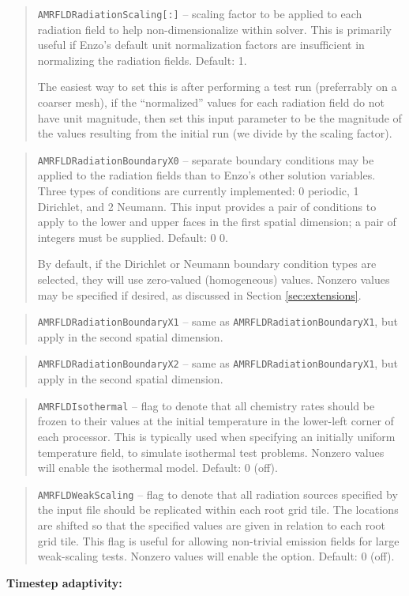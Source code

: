 \documentclass[10pt]{article}
\renewcommand{\(}{\left(}
\renewcommand{\)}{\right)}
\begin{document}
\blockquote{{\tt AMRFLDRadiationScaling[:]} -- scaling factor to be
  applied to each radiation field to help non-dimensionalize within
  solver.  This is primarily useful if Enzo's default unit
  normalization factors are insufficient in normalizing the radiation
  fields.  Default: 1.

  The easiest way to set this is after performing a test run
  (preferrably on a coarser mesh), if the ``normalized'' values for
  each radiation field do not have unit magnitude, then set this input
  parameter to be the magnitude of the values resulting from the
  initial run (we divide by the scaling factor).}
%
\blockquote{{\tt AMRFLDRadiationBoundaryX0} -- separate boundary
  conditions may be applied to the radiation fields than to Enzo's
  other solution variables.  Three types of conditions are currently
  implemented: 0 periodic, 1 Dirichlet, and 2 Neumann.  This input
  provides a pair of conditions to apply to the lower and upper faces
  in the first spatial dimension; a pair of integers must be supplied.
  Default: 0 0.

  By default, if the Dirichlet or Neumann boundary condition types are
  selected, they will use zero-valued (homogeneous) values.  Nonzero
  values may be specified if desired, as discussed in Section
  \ref{sec:extensions}.
}
%
\blockquote{{\tt AMRFLDRadiationBoundaryX1} -- same as 
  {\tt AMRFLDRadiationBoundaryX1}, but apply in the second spatial
  dimension.} 
%
\blockquote{{\tt AMRFLDRadiationBoundaryX2} -- same as 
  {\tt AMRFLDRadiationBoundaryX1}, but apply in the second spatial
  dimension.}
%
\blockquote{{\tt AMRFLDIsothermal} -- flag to denote that all
  chemistry rates should be frozen to their values at the initial
  temperature in the lower-left corner of each processor.  This is
  typically used when specifying an initially uniform temperature
  field, to simulate isothermal test problems.  Nonzero values will
  enable the isothermal model.  Default: 0 (off).}
%
\blockquote{{\tt AMRFLDWeakScaling} -- flag to denote that all
  radiation sources specified by the input file should be replicated
  within each root grid tile.  The locations are shifted so that the
  specified values are given in relation to each root grid tile.  This
  flag is useful for allowing non-trivial emission fields for
  large weak-scaling tests.  Nonzero values will enable the option.
  Default: 0 (off).}



{\bf Timestep adaptivity:}
\end{document}
